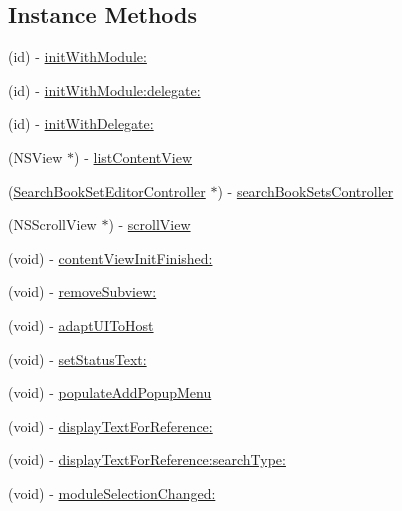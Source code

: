 \subsection*{Instance Methods}
\begin{DoxyCompactItemize}
\item 
(id) -\/ \hyperlink{interface_bible_view_controller_af443ea8211427f78371e7e63c57bd40d}{init\-With\-Module\-:}
\item 
(id) -\/ \hyperlink{interface_bible_view_controller_ab963fe1086f8c00c1eb279b65e44d693}{init\-With\-Module\-:delegate\-:}
\item 
(id) -\/ \hyperlink{interface_bible_view_controller_a31987d71b58e0520588676a4f6896d2c}{init\-With\-Delegate\-:}
\item 
(N\-S\-View $\ast$) -\/ \hyperlink{interface_bible_view_controller_a726ea6c924bda6200d37751ca723d7b5}{list\-Content\-View}
\item 
(\hyperlink{interface_search_book_set_editor_controller}{Search\-Book\-Set\-Editor\-Controller} $\ast$) -\/ \hyperlink{interface_bible_view_controller_a39ac082e8202533e8da4e258c2a5b0b0}{search\-Book\-Sets\-Controller}
\item 
(N\-S\-Scroll\-View $\ast$) -\/ \hyperlink{interface_bible_view_controller_ab5c8560f3d7dae1e05cd95201f975026}{scroll\-View}
\item 
(void) -\/ \hyperlink{interface_bible_view_controller_a0bd73ec236f8055ac6566b39ddf66add}{content\-View\-Init\-Finished\-:}
\item 
(void) -\/ \hyperlink{interface_bible_view_controller_afc97bbb7e9b0d2f6b9fd995ada16f4a1}{remove\-Subview\-:}
\item 
(void) -\/ \hyperlink{interface_bible_view_controller_acda22137b423344be66ad81dd4efc461}{adapt\-U\-I\-To\-Host}
\item 
(void) -\/ \hyperlink{interface_bible_view_controller_a86f5fa035efb2e0d568cf4cf9e621358}{set\-Status\-Text\-:}
\item 
(void) -\/ \hyperlink{interface_bible_view_controller_a2d966fd429cd6d3e41dd7a10758658d1}{populate\-Add\-Popup\-Menu}
\item 
(void) -\/ \hyperlink{interface_bible_view_controller_aee0469066a38e5b41b9de3e4e87fe05b}{display\-Text\-For\-Reference\-:}
\item 
(void) -\/ \hyperlink{interface_bible_view_controller_aee0f4fccfed1c999da9746c4a8ed6fc0}{display\-Text\-For\-Reference\-:search\-Type\-:}
\item 
(void) -\/ \hyperlink{interface_bible_view_controller_a791ebf2a85348d6da1a7f7b3ef8cf7f7}{module\-Selection\-Changed\-:}

\end{DoxyCompactItemize}
